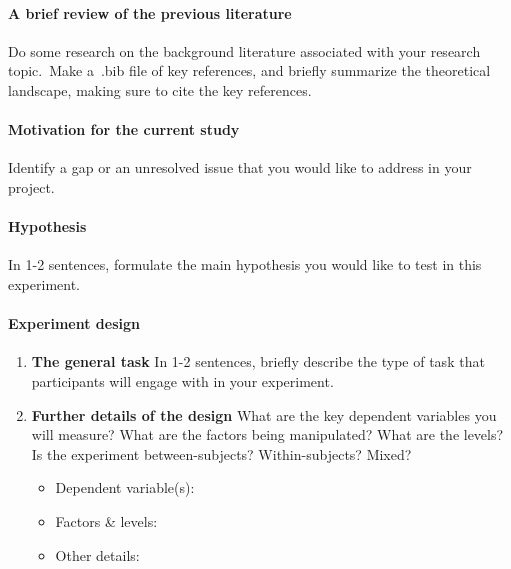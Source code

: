 \documentclass{article}
\begin{document}
\paragraph{A brief review of the previous literature}

Do some research on the background literature associated with your research topic.\ Make a~.bib file of key references, and briefly summarize the theoretical landscape, making sure to cite the key references.


\paragraph{Motivation for the current study}

Identify a gap or an unresolved issue that you would like to address in your project. 


\paragraph{Hypothesis}

In 1-2 sentences, formulate the main hypothesis you would like to test in this experiment.


\paragraph{Experiment design}

\begin{enumerate}

    \item \textbf{The general task} In 1-2 sentences, briefly describe the type of task that participants will engage with in your experiment.

    \item \textbf{Further details of the design} What are the key dependent variables you will measure? What are the factors being manipulated? What are the levels? Is the experiment between-subjects? Within-subjects? Mixed? 

    \begin{itemize}
        \item Dependent variable(s):
        \item Factors \& levels:
        \item Other details:
    \end{itemize}

\end{enumerate}
\end{document}

